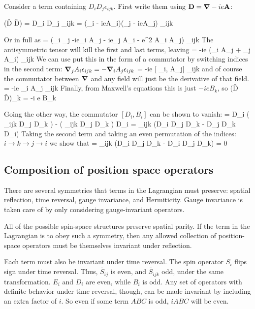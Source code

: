 Consider a term containing $D_i D_j \epsilon_{ijk}$.  First write them using $\mathbf{D} = \mbox{\boldmath$ \nabla $} - i e\mathbf{A}$:

\beq
	(\v{D} \times \v{D}) = D_i D_j \epsilon_{ijk} = (\grad_i - ieA_i)(\grad_j - ieA_j) \epsilon_{ijk}
\eeq

Or in full as
\beq
	= (\grad_i \grad_j -ie\grad_i A_j - ie\grad_j A_i - e^2 A_i A_j) \epsilon_{ijk}
\eeq
The antisymmetric tensor will kill the first and last terms, leaving
\beq
	= -ie (\grad_i A_j + \grad_j A_i) \epsilon_{ijk}
\eeq
We can use put this in the form of a commutator by switching indices in the second term: $\mbox{\boldmath$ \nabla $} _j A_i \epsilon_{ijk} = - \mbox{\boldmath$ \nabla $} _i A_j \epsilon_{ijk}$
\beq
	= -ie [ \grad_i, A_j] \epsilon_{ijk}
\eeq
and of course the commutator between $\grad$ and any field will just be the derivative of that field.
\beq
	= -ie \partial_i A_j \epsilon_{ijk}
\eeq
Finally, from Maxwell's equations this is just  $-ie B_k$, so 
\beq
	(\v{D} \times \v{D})_k = -i e B_k
\eeq

Going the other way, the commutator $[D_i, B_i]$ can be shown to vanish:
\beq
	[D_i, B_i] = D_i ( \epsilon_{ijk} D_j D_k ) - ( \epsilon_{ijk} D_j D_k ) D_i
			= \epsilon_{ijk} (D_i D_j D_k - D_j D_k D_i)
\eeq
Taking the second term and taking an even permutation of the indices: $i \to k \to j \to i$ we show that
\beq
	[D_i, B_i] = \epsilon_{ijk} (D_i D_j D_k - D_i D_j D_k) = 0
\eeq




\subsection{Composition of position space operators}

There are several symmetries that terms in the Lagrangian must preserve: spatial reflection, time reversal, gauge invariance, and Hermiticity.  Gauge invariance is taken care of by only considering gauge-invariant operators.

All of the possible spin-space structures preserve spatial parity.  If the term in the Lagrangian is to obey such a symmetry, then any allowed collection of position-space operators must be themselves invariant under reflection.  

Each term must also be invariant under time reversal.  The spin operator $S_i$ flips sign under time reversal.  Thus, $\bar{S}_{ij}$ is even, and $\bar{S}_{ijk}$ odd, under the same transformation.  $E_i$ and $D_i$ are even, while $B_i$ is odd.  Any set of operators with definite behavior under time reversal, though, can be made invariant by including an extra factor of $i$.  So even if some term $ABC$ is odd, $iABC$ will be even.

